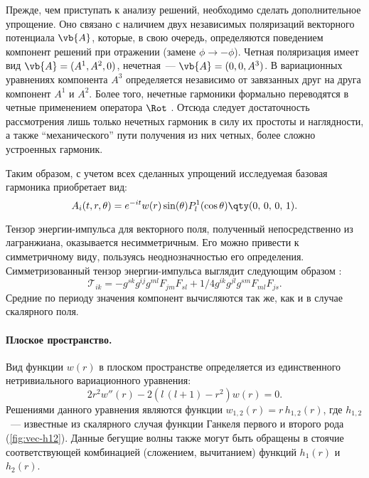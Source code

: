 \documentclass[\docroot/reports/draft/report.tex]{subfiles}
\begin{document}
    Прежде, чем приступать к анализу решений, необходимо сделать дополнительное упрощение. Оно связано с наличием двух независимых поляризаций векторного потенциала $\vb{A}$, которые, в свою очередь, определяются поведением компонент решений при отражении (замене $\phi \to -\phi$). Четная поляризация имеет вид $\vb{A} = (A^1, A^2, 0)$, нечетная~--- $\vb{A} = (0, 0, A^3)$. В вариационных уравнениях компонента $A^3$ определяется независимо от завязанных друг на друга компонент $A^1$ и $A^2$. Более того, нечетные гармоники формально переводятся в четные применением оператора $\Rot$ \cite{Vas2018a,BurVas2019}. Отсюда следует достаточность рассмотрения лишь только нечетных гармоник в силу их простоты и наглядности, а также \enquote{механического} пути получения из них четных, более сложно устроенных гармоник.

    Таким образом, с учетом всех сделанных упрощений исследуемая базовая гармоника приобретает вид:
    \begin{equation*}
        A_i(t,r,\theta) = e^{-i t} w(r) \sin(\theta) P_l^1(\cos\theta) \qty(0,\,0,\,0,\,1).
    \end{equation*}

    Тензор энергии-импульса для векторного поля, полученный непосредственно из лагранжиана, оказывается несимметричным. Его можно привести к симметричному виду, пользуясь неоднозначностью его определения. Симметризованный тензор энергии-импульса выглядит следующим образом \cite{landau_v2}:
    \begin{equation*}
        \mathcal{T}_{ik} = -g^{sk} g^{ij} g^{ml} F_{jm} F_{sl} + 1/4 g^{ik} g^{jl} g^{sm} F_{ml} F_{js} .
    \end{equation*}
    Средние по периоду значения компонент вычисляются так же, как и в случае скалярного поля.

    \paragraph{Плоское пространство.}

        Вид функции $w(r)$ в плоском пространстве определяется из единственного нетривиального вариационного уравнения:
        \begin{equation}\label{eq:vec-m-eq}
            2 r^2 w''(r) - 2 (l\,(l + 1) - r^2) w(r) = 0.
        \end{equation}
        Решениями данного уравнения являются функции $w_{1,2}(r) = r\,h_{1,2}(r)$, где $h_{1,2}$~--- известные из скалярного случая функции Ганкеля первого и второго рода (\autoref{fig:vec-h12}). Данные бегущие волны также могут быть обращены в стоячие соответствующей комбинацией (сложением, вычитанием) функций $h_1(r)$ и $h_2(r)$.
\end{document}
